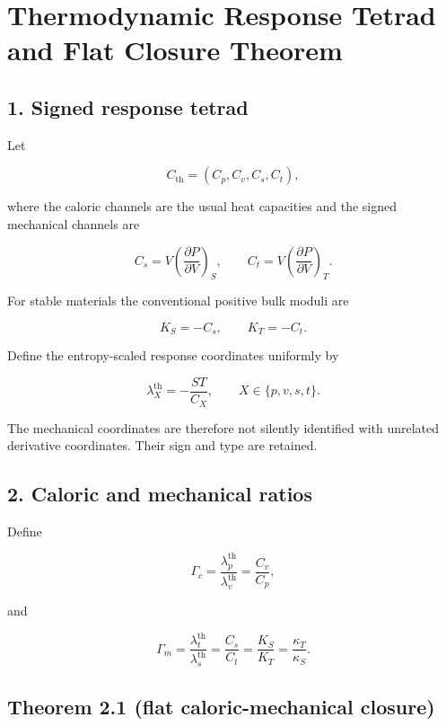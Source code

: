 \hypertarget{thermodynamic-response-tetrad-and-flat-closure-theorem}{%
\chapter{Thermodynamic Response Tetrad and Flat Closure Theorem}\label{thermodynamic-response-tetrad-and-flat-closure-theorem}}

\hypertarget{signed-response-tetrad}{%
\section{1. Signed response tetrad}\label{signed-response-tetrad}}

Let

\[
C_{\mathrm{th}}=(C_p,C_v,C_s,C_t),
\]

where the caloric channels are the usual heat capacities and the signed mechanical channels are

\[
C_s=V\left(\frac{\partial P}{\partial V}\right)_S,
\qquad
C_t=V\left(\frac{\partial P}{\partial V}\right)_T.
\]

For stable materials the conventional positive bulk moduli are

\[
K_S=-C_s,
\qquad
K_T=-C_t.
\]

Define the entropy-scaled response coordinates uniformly by

\[
\boxed{
\lambda_X^{\mathrm{th}}=-\frac{ST}{C_X},
\qquad X\in\{p,v,s,t\}.
}
\]

The mechanical coordinates are therefore not silently identified with unrelated derivative coordinates. Their sign and type are retained.

\hypertarget{caloric-and-mechanical-ratios}{%
\section{2. Caloric and mechanical ratios}\label{caloric-and-mechanical-ratios}}

Define

\[
\Gamma_c
=\frac{\lambda_p^{\mathrm{th}}}{\lambda_v^{\mathrm{th}}}
=\frac{C_v}{C_p},
\]

and

\[
\Gamma_m
=\frac{\lambda_t^{\mathrm{th}}}{\lambda_s^{\mathrm{th}}}
=\frac{C_s}{C_t}
=\frac{K_S}{K_T}
=\frac{\kappa_T}{\kappa_S}.
\]

\hypertarget{theorem-2.1-flat-caloric-mechanical-closure}{%
\section{Theorem 2.1 (flat caloric-mechanical closure)}\label{theorem-2.1-flat-caloric-mechanical-closure}}

